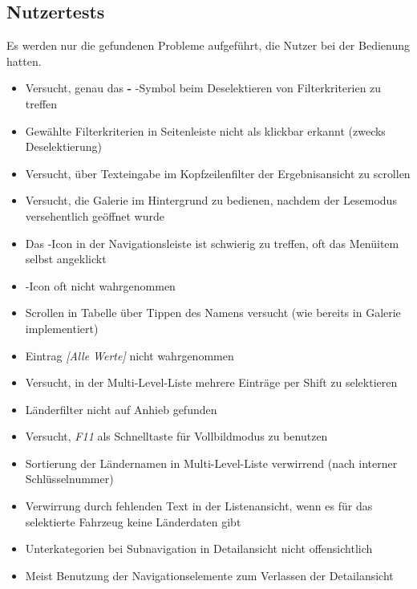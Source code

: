 \subsection{Nutzertests} \label{sec:resultUser}
Es werden nur die gefundenen Probleme aufgeführt, die Nutzer bei der Bedienung hatten.
\begin{itemize}
 \item Versucht, genau das \textbf{-} -Symbol beim Deselektieren von Filterkriterien zu treffen
 \item Gewählte Filterkriterien in Seitenleiste nicht als klickbar erkannt (zwecks Deselektierung)
 \item Versucht, über Texteingabe im Kopfzeilenfilter der Ergebnisansicht zu scrollen
\end{itemize}
\begin{itemize}
 \item Versucht, die Galerie im Hintergrund zu bedienen, nachdem der Lesemodus versehentlich geöffnet wurde
 \item Das -Icon in der Navigationsleiste ist schwierig zu treffen, oft das Menüitem selbst angeklickt
 \item {}-Icon oft nicht wahrgenommen
 \item Scrollen in Tabelle über Tippen des Namens versucht (wie bereits in Galerie implementiert)
\end{itemize}
\begin{itemize}
 \item Eintrag \textit{[Alle Werte]} nicht wahrgenommen
 \item Versucht, in der Multi-Level-Liste mehrere Einträge per Shift zu selektieren
\end{itemize}
\begin{itemize}
 \item Länderfilter nicht auf Anhieb gefunden
 \item Versucht, \textit{F11} als Schnelltaste für Vollbildmodus zu benutzen
 \item Sortierung der Ländernamen in Multi-Level-Liste verwirrend (nach interner Schlüsselnummer)
 \item Verwirrung durch fehlenden Text in der Listenansicht, wenn es für das selektierte Fahrzeug keine Länderdaten gibt
 \item Unterkategorien bei Subnavigation in Detailansicht nicht offensichtlich
 \item Meist Benutzung der Navigationselemente zum Verlassen der Detailansicht
\end{itemize}
